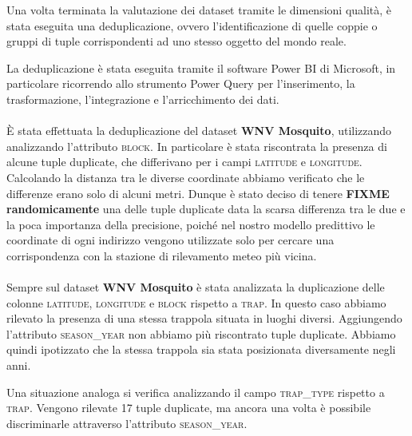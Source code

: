 Una volta terminata la valutazione dei dataset tramite le dimensioni qualità, è 
stata eseguita una deduplicazione, ovvero l'identificazione di quelle coppie 
o gruppi di tuple corrispondenti ad uno stesso oggetto del mondo reale.

La deduplicazione è stata eseguita tramite il software Power BI di Microsoft, 
in particolare ricorrendo allo strumento Power Query per l'inserimento, la 
trasformazione, l'integrazione e l'arricchimento dei dati.
\\\\	
È stata effettuata la deduplicazione del dataset \textbf{WNV Mosquito}, utilizzando analizzando l'attributo \textsc{block}. In particolare è stata riscontrata la presenza di alcune tuple duplicate, che differivano per i campi \textsc{latitude} e \textsc{longitude}. Calcolando la distanza tra le diverse coordinate abbiamo verificato che le differenze erano solo di alcuni metri.
Dunque è stato deciso di tenere \textbf{FIXME randomicamente} una delle tuple 
duplicate data la scarsa differenza tra le due e la poca importanza della 
precisione, poiché nel nostro modello predittivo le coordinate di ogni 
indirizzo vengono utilizzate solo per cercare una corrispondenza con la 
stazione di rilevamento meteo più vicina.
\\\\
Sempre sul dataset \textbf{WNV Mosquito} è stata analizzata la duplicazione 
delle colonne \textsc{latitude}, \textsc{longitude} e \textsc{block} rispetto a 
\textsc{trap}. In questo caso abbiamo rilevato la presenza di una stessa 
trappola situata in luoghi diversi. Aggiungendo l'attributo 
\textsc{season\_year} non abbiamo più riscontrato tuple duplicate. Abbiamo 
quindi ipotizzato che la stessa trappola sia stata posizionata diversamente 
negli anni.

Una situazione analoga si verifica analizzando il campo \textsc{trap\_type} 
rispetto a \textsc{trap}. Vengono rilevate 17 tuple duplicate, ma ancora una 
volta è possibile discriminarle attraverso l'attributo \textsc{season\_year}.
